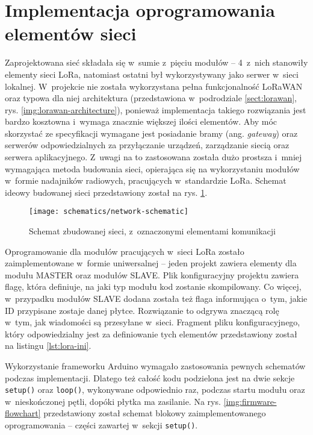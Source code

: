 \FloatBarrier
\section{Implementacja oprogramowania elementów sieci\label{sect:firmware-network}} Zaprojektowana sieć składała się
w~sumie z~pięciu modułów -- 4~z~nich stanowiły elementy sieci LoRa, natomiast ostatni był wykorzystywany jako serwer
w~sieci lokalnej. W~projekcie nie została wykorzystana pełna funkcjonalność LoRaWAN oraz typowa dla niej architektura
(przedstawiona w~podrodziale \ref{sect:lorawan}, rys. \ref{img:lorawan-architecture}), ponieważ implementacja takiego
rozwiązania jest bardzo kosztowna i~wymaga znacznie większej ilości elementów. Aby móc skorzystać ze specyfikacji
wymagane jest posiadanie bramy (ang. \textsl{gateway}) oraz serwerów odpowiedzialnych za przyłączanie urządzeń,
zarządzanie siecią oraz serwera aplikacyjnego. Z~uwagi na to zastosowana została dużo prostsza i~mniej wymagająca metoda
budowania sieci, opierająca się na wykorzystaniu modułów w~formie nadajników radiowych, pracujących w~standardzie LoRa.
Schemat ideowy budowanej sieci przedstawiony został na rys. \ref{img:network-schematic}.

\begin{figure}[!htbp]
    \centering
    \texttt{[image: schematics/network-schematic]}
    \caption{\label{img:network-schematic}Schemat zbudowanej sieci, z~oznaczonymi elementami komunikacji}
\end{figure}

Oprogramowanie dla modułów pracujących w~sieci LoRa zostało zaimplementowane w~formie uniwersalnej -- jeden projekt
zawiera elementy dla modułu MASTER oraz modułów SLAVE. Plik konfiguracyjny projektu zawiera flagę, która definiuje, na
jaki typ modułu kod zostanie skompilowany. Co więcej, w~przypadku modułów SLAVE dodana została też flaga informująca
o~tym, jakie ID przypisane zostaje danej płytce. Rozwiązanie to odgrywa znaczącą rolę w~tym, jak wiadomości są
przesyłane w~sieci. Fragment pliku konfiguracyjnego, który odpowiedzialny jest za definiowanie tych elementów
przedstawiony został na listingu \ref{lst:lora-ini}.



Wykorzystanie frameworku Arduino wymagało zastosowania pewnych schematów podczas implementacji. Dlatego też całość kodu
podzielona jest na dwie sekcje \texttt{setup()} oraz \texttt{loop()}, wykonywane odpowiednio raz, podczas startu modułu
oraz w~nieskończonej pętli, dopóki płytka ma zasilanie. Na rys. \ref{img:firmware-flowchart} przedstawiony został
schemat blokowy zaimplementowanego oprogramowania -- części zawartej w~sekcji \texttt{setup()}.

